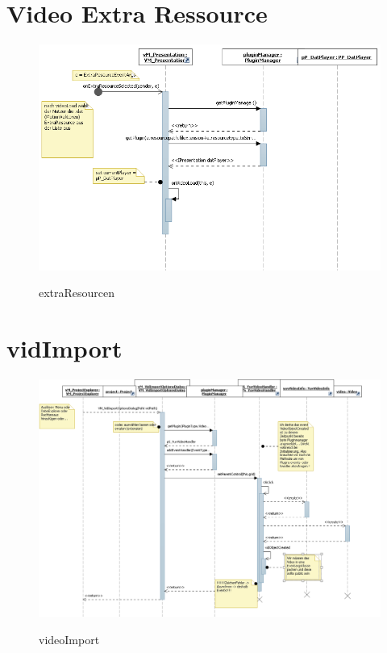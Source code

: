 \section{Video Extra Ressource}
\begin{figure}[h]
\includegraphics[width=\linewidth]{bilder/Sequenzdiagramm/extraResourcen.png}
\label{}
\caption{extraResourcen}
\end{figure}

\section{vidImport}
\begin{figure}[h]
\includegraphics[width=\linewidth]{bilder/Sequenzdiagramm/videoImport.png}
\label{}
\caption{videoImport}
\end{figure}